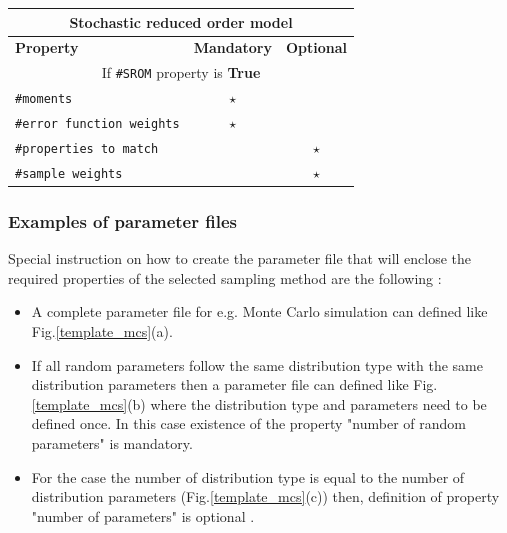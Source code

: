\begin{center}
	\begin{tabular}{ |l|c|c| } 
		\hline
		\multicolumn{3}{|c|}{\textbf{Stochastic reduced order model}} \\
		\hline
		\textbf{Property} & \textbf{Mandatory} & \textbf{Optional} \\
		\hline
		\multicolumn{3}{|c|}{If \texttt{\#SROM} property is \textbf{True}} \\
		\hline
		\texttt{\#moments}& $\star$ &   \\ 
		\hline
		\texttt{\#error function weights} & $\star$ &   \\ 
		\hline
		\texttt{\#properties to match}&  &  $\star$  \\ 
		\hline
		\texttt{\#sample weights}& & $\star$   \\ 
		\hline
	\end{tabular}
\end{center}


\subsubsection{Examples of parameter files}


\noindent
 Special instruction on how to create the parameter file that will enclose the required properties of the selected sampling method are the following :
 
 \begin{itemize}
 	 	\item  A complete parameter file for  e.g. Monte Carlo simulation can defined like Fig.\ref{template_mcs}(a).
 	
 	\item  If all random parameters follow the same distribution type with the same distribution parameters then a parameter file  can defined like Fig.\ref{template_mcs}(b) where the distribution type and parameters need to be defined once. In this case existence of the property  "number of random parameters" is mandatory.
 	
 	 \item  For the case the number of distribution type is equal to the number of distribution parameters (Fig.\ref{template_mcs}(c))  then, definition of property "number of parameters" is optional .
 	\end{itemize}


